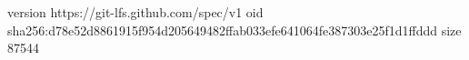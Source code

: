 version https://git-lfs.github.com/spec/v1
oid sha256:d78e52d8861915f954d205649482ffab033efe641064fe387303e25f1d1ffddd
size 87544
